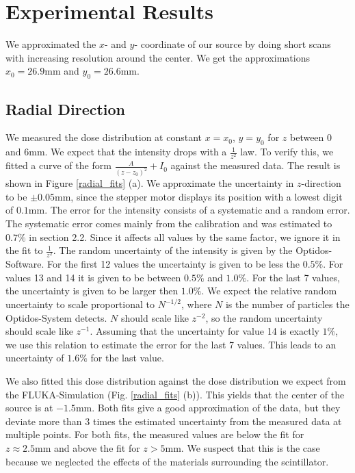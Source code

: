 \documentclass[a4paper,parskip]{scrartcl}
\begin{document}
\section{Experimental Results}

We approximated the $x$- and $y$- coordinate of our source by doing short scans with increasing resolution around the center. We get the approximations $x_0 = 26.9 \mathrm{mm}$ and $y_0 = 26.6 \mathrm{mm}$.

\subsection{Radial Direction}


We measured the dose distribution at constant $x=x_0$, $y=y_0$ for $z$ between 0 and 6mm. We expect that the intensity drops with a $\frac{1}{z^ 2}$ law. To verify this, we fitted a curve of the form $\frac{A}{(z-z_0)^ 2}+I_0$ against the measured data. The result is shown in Figure \ref{radial_fits} (a). We approximate the uncertainty in $z$-direction to be $\pm 0.05 \mathrm{mm}$, since the stepper motor displays its position with a lowest digit of $0.1\mathrm{mm}$. The error for the intensity consists of a systematic and a random error. The systematic error comes mainly from the calibration and was estimated to $0.7\%$ in section 2.2. Since it affects all values by the same factor, we ignore it in the fit to $\frac{1}{z^2}$. The random uncertainty of the intensity is given by the Optidos-Software. For the first 12 values the uncertainty is given to be less the $0.5\%$. For values 13 and 14 it is given to be between $0.5\%$ and $1.0\%$. For the last 7 values, the uncertainty is given to be larger then $1.0\%$. We expect the relative random uncertainty to scale proportional to $N^ {-1/2}$, where $N$ is the number of particles the Optidos-System detects. $N$ should scale like $z^ {-2}$, so the random uncertainty should scale like $z^ {-1}$. Assuming that the uncertainty for value 14 is exactly $1\%$, we use this relation to estimate the error for the last 7 values. This leads to an uncertainty of $1.6\%$ for the last value.

We also fitted this dose distribution against the dose distribution we expect from the FLUKA-Simulation (Fig. \ref{radial_fits} (b)). This yields that the center of the source is at $-1.5 \mathrm{mm}$. Both fits give a good approximation of the data, but they deviate more than 3 times the estimated uncertainty from the measured data at multiple points. For both fits, the measured values are below the fit for $z \approx 2.5 \mathrm{mm}$ and above the fit for $z > 5 \mathrm{mm}$. We suspect that this is the case because we neglected the effects of the materials surrounding the scintillator. 
\end{document}
